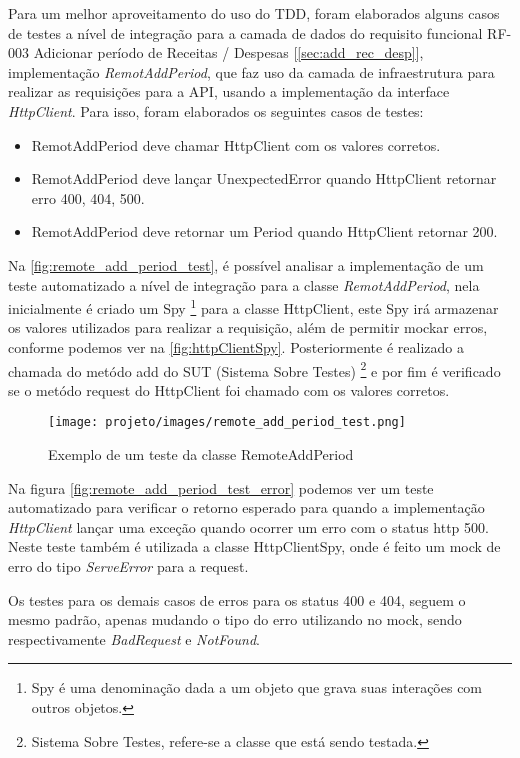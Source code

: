 \documentclass[12pt]{article}
\begin{document}
Para um melhor aproveitamento do uso do TDD, foram elaborados alguns casos de testes a nível de integração para a camada de dados do requisito funcional RF-003 Adicionar período de Receitas / Despesas [\ref{sec:add_rec_desp}], implementação \emph{RemotAddPeriod}, que faz uso da camada de infraestrutura para realizar as requisições para a API, usando a implementação da interface \emph{HttpClient}. Para isso, foram elaborados os seguintes casos de testes:

\begin{itemize}
    \item RemotAddPeriod deve chamar HttpClient com os valores corretos.
    \item RemotAddPeriod deve lançar UnexpectedError quando HttpClient retornar erro 400, 404, 500.
    \item RemotAddPeriod deve retornar um Period quando HttpClient retornar 200.
\end{itemize}

Na \autoref{fig:remote_add_period_test}, é possível analisar a implementação de um teste automatizado a nível de integração para a classe \emph{RemotAddPeriod}, nela inicialmente é criado um Spy \footnote{Spy é uma denominação dada a um objeto que grava suas interações com outros objetos.} para a classe HttpClient, este Spy irá armazenar os valores utilizados para realizar a requisição, além de permitir mockar erros, conforme podemos ver na \autoref{fig:httpClientSpy}. Posteriormente é realizado a chamada do metódo add do SUT (Sistema Sobre Testes) \footnote{Sistema Sobre Testes, refere-se a classe que está sendo testada.} e por fim é verificado se o metódo request do HttpClient foi chamado com os valores corretos.

\begin{figure}[!ht]
  \centering
  \texttt{[image: projeto/images/remote\_add\_period\_test.png]}
  \caption{Exemplo de um teste da classe RemoteAddPeriod}
  \label{fig:remote_add_period_test}
\end{figure}

Na figura \autoref{fig:remote_add_period_test_error} podemos ver um teste automatizado para verificar o retorno esperado para quando a implementação \emph{HttpClient} lançar uma exceção quando ocorrer um erro com o status http 500. Neste teste também é utilizada a classe HttpClientSpy, onde é feito um mock de erro do tipo \emph{ServeError} para a request.

Os testes para os demais casos de erros para os status 400 e 404, seguem o mesmo padrão, apenas mudando o tipo do erro utilizando no mock, sendo respectivamente \emph{BadRequest} e \emph{NotFound}.
\end{document}
